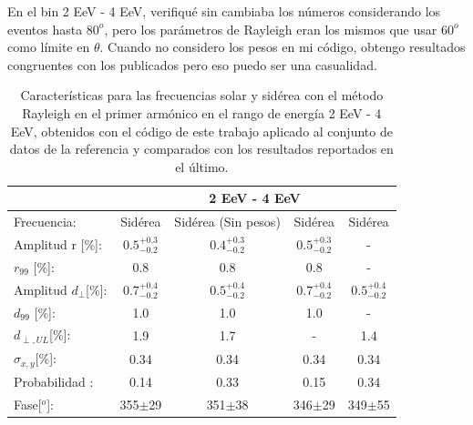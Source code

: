 En el bin 2 EeV - 4 EeV, verifiqué sin cambiaba los números considerando los eventos hasta $80^o$, pero los parámetros de Rayleigh eran los mismos que usar $60^o$  como límite en $\theta$.  Cuando no considero los pesos en mi código, obtengo resultados congruentes con los publicados pero eso puedo ser una casualidad.

\begin{table}[H]
    \begin{small}
        \begin{center}
            \begin{tabular}[c]{l|c|c|c|c|}
                                            & \multicolumn{4}{|c|}{2 EeV - 4 EeV}                                                               \\ \hline
                Frecuencia:                 & Sidérea              & Sidérea (Sin pesos)  & Sidérea \cite{codigo}    & Sidérea \cite{Aab_2020}   \\ \hline
                Amplitud r [\%]:            & $0.5^{+0.3}_{-0.2}$ & $0.4^{+0.3}_{-0.2}$ & $0.5^{+0.3}_{-0.2}$     & -                          \\
                $r_{99}$ [\%]:              & 0.8                 & 0.8                 & 0.8                     & -                          \\\hline
                Amplitud $d_\perp$[\%]:     & $0.7^{+0.4}_{-0.2}$ & $0.5^{+0.4}_{-0.2}$ & $0.7^{+0.4}_{-0.2}$ 	  & $0.5^{+0.4}_{-0.2}$                    \\
                $d_{99}$ [\%]:              & 1.0                 & 1.0                 & 1.0                     & -                         \\
                $d_{\perp,UL}$[\%]:         & 1.9                 & 1.7                 & -                       & 1.4                               \\\hline
                $\sigma_{x,y}$[\%]:         & 0.34	              & 0.34	            & 0.34	                  & 0.34                           \\
                Probabilidad      :         & 0.14                & 0.33                & 0.15               	  & 0.34                       \\
                Fase[$^o$]:                 & 355$\pm$29          & 351$\pm$38          & 346$\pm$29              & 349$\pm$55                    \\\hline
            \end{tabular}
        \end{center}
    \end{small}
    \caption{Características para las frecuencias solar y sidérea con el método Rayleigh en el primer armónico en el rango de energía 2 EeV - 4 EeV, obtenidos con el código de este trabajo aplicado al conjunto de datos de la referencia \cite{Aab_2020} y comparados con los resultados reportados en el último.}
\end{table}


